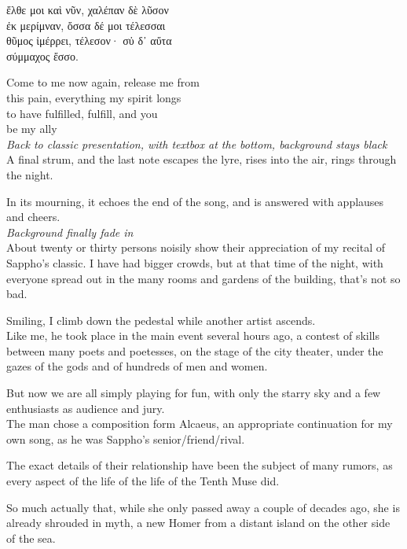 \documentclass{report}
\newcommand{\dcomment}[1]{
	\emph{#1}
	\\
}
\begin{document}
\begin{otherlanguage}{greek}
ἔλθε μοι καὶ νῦν, χαλέπαν δὲ λῦσον\\
ἐκ μερίμναν, ὄσσα δέ μοι τέλεσσαι\\
θῦμος ἰμέρρει, τέλεσον· σὐ δ᾽ αὔτα\\
σύμμαχος ἔσσο.
\end{otherlanguage}

Come to me now again, release me from\\
this pain, everything my spirit longs\\
to have fulfilled, fulfill, and you\\
be my ally
\\

\dcomment{
	Back to classic presentation, with textbox at the bottom, background stays black
}

A final strum, and the last note escapes the lyre, rises into the air, rings through the night.

In its mourning, it echoes the end of the song, and is answered with applauses and cheers.\\

\dcomment{
	Background finally fade in
}

About twenty or thirty persons noisily show their appreciation of my recital of Sappho's classic. I have had bigger crowds, but at that time of the night, with everyone spread out in the many rooms and gardens of the building, that's not so bad.

Smiling, I climb down the pedestal while another artist ascends.\\

Like me, he took place in the main event several hours ago, a contest of skills between many poets and poetesses, on the stage of the city theater, under the gazes of the gods and of hundreds of men and women.

But now we are all simply playing for fun, with only the starry sky and a few enthusiasts as audience and jury.\\

The man chose a composition form Alcaeus, an appropriate continuation for my own song, as he was Sappho's senior/friend/rival.

The exact details of their relationship have been the subject of many rumors, as every aspect of the life of the life of the Tenth Muse did.

So much actually that, while she only passed away a couple of decades ago, she is already shrouded in myth, a new Homer from a distant island on the other side of the sea.\\
\end{document}
